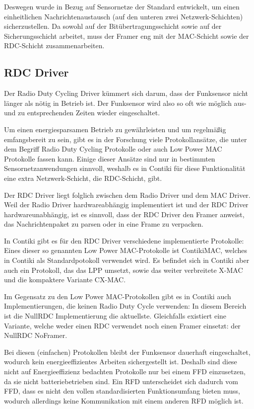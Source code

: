 	Deswegen wurde in Bezug auf Sensornetze der Standard \ieeeframe{}
	entwickelt, um einen einheitlichen Nachrichtenaustausch (auf den
	unteren zwei Netzwerk-Schichten) sicherzustellen.  Da \ieeeframe{}
	sowohl auf der Bitübertragungsschicht sowie auf der Sicherungsschicht
	arbeitet, muss der Framer eng mit der \acs{MAC}-Schicht sowie der
	\acs{RDC}-Schicht zusammenarbeiten.

\subsection{RDC Driver}
	Der Radio Duty Cycling Driver kümmert sich darum, dass der Funksensor
	\idR nicht länger als nötig in Betrieb ist.  Der Funksensor wird also
	so oft wie möglich aus- und zu entsprechenden Zeiten wieder
	eingeschaltet.

	Um einen energiesparsamen Betrieb zu gewährleisten und um regelmäßig
	emfangsbereit zu sein, gibt es in der Forschung viele Protokollansätze,
	die unter dem Begriff Radio Duty Cycling Protokolle oder auch Low Power
	MAC Protokolle fassen kann.  Einige dieser Ansätze sind nur in
	bestimmten Sensornetzanwendungen sinnvoll, weshalb es in Contiki für
	diese Funktionalität eine extra Netzwerk-Schicht, die RDC-Schicht,
	gibt.

	Der RDC Driver liegt folglich zwischen dem Radio Driver und dem MAC
	Driver. Weil der Radio Driver hardwareabhängig implementiert ist und
	der RDC Driver hardwareunabhängig, ist es sinnvoll, dass der RDC Driver
	den Framer anweist, das Nachrichtenpaket zu parsen oder in eine Frame
	zu verpacken.

	In Contiki gibt es für den RDC Driver verschiedene implementierte
	Protokolle: Eines dieser so genannten Low Power MAC-Protokolle ist
	ContikiMAC, welches \iA in Contiki als Standardpotokoll verwendet wird.
	Es befindet sich in Contiki aber auch ein Protokoll, das das \acf{LPP}
	umsetzt, sowie das weiter verbreitete X-MAC und die kompaktere Variante
	CX-MAC.

	Im Gegensatz zu den Low Power MAC-Protokollen gibt es in Contiki auch
	Implementierungen, die keinen Radio Duty Cycle verwenden: In diesem
	Bereich ist die NullRDC Implementierung die aktuellste.  Gleichfalls
	existiert eine Variante, welche weder einen RDC verwendet noch einen
	Framer einsetzt: der NullRDC NoFramer.

	Bei diesen (einfachen) Protokollen bleibt der Funksensor \iA dauerhaft
	eingeschaltet, wodurch kein energieeffizientes Arbeiten sichergestellt
	ist.  Deshalb sind diese nicht auf Energieeffizienz bedachten
	Protokolle nur bei einem \ac{FFD} einzusetzen, da sie \idR nicht
	batteriebetrieben sind. Ein \ac{RFD} unterscheidet sich dadurch vom
	\ac{FFD}, dass es nicht den vollen standardisierten Funktionsumfang
	bieten muss, wodurch allerdings keine Kommunikation mit einem anderen
	\ac{RFD} möglich ist.

